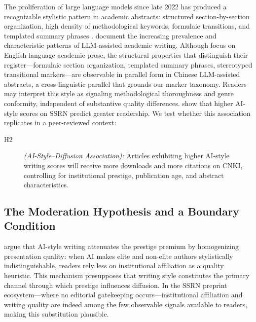 \documentclass[12pt,a4paper]{article}
\begin{document}
The proliferation of large language models since late 2022 has produced
a recognizable stylistic pattern in academic abstracts: structured
section-by-section organization, high density of methodological keywords,
formulaic transitions, and templated summary phrases
\citep{Liang2024,Biber2016}.
\citet{Liang2024} document the increasing prevalence and characteristic
patterns of LLM-assisted academic writing.
Although \citet{Biber2016} focus on English-language academic prose,
the structural properties that distinguish their register---formulaic
section organization, templated summary phrases, stereotyped transitional
markers---are observable in parallel form in Chinese LLM-assisted
abstracts, a cross-linguistic parallel that grounds our marker taxonomy.
Readers may interpret this style as signaling methodological
thoroughness and genre conformity, independent of substantive quality
differences.
\citet{JoLi2026} show that higher AI-style scores on SSRN predict
greater readership.
We test whether this association replicates in a peer-reviewed context:
\begin{description}
  \item[H2] \textit{(AI-Style--Diffusion Association):}
  Articles exhibiting higher AI-style writing scores will receive
  more downloads and more citations on CNKI, controlling for
  institutional prestige, publication age, and abstract
  characteristics.
\end{description}

\subsection{The Moderation Hypothesis and a Boundary Condition}

\citet{JoLi2026} argue that AI-style writing attenuates the prestige
premium by homogenizing presentation quality: when AI makes elite and
non-elite authors stylistically indistinguishable, readers rely less
on institutional affiliation as a quality heuristic.
This mechanism presupposes that writing style constitutes the primary
channel through which prestige influences diffusion.
In the SSRN preprint ecosystem---where no editorial gatekeeping
occurs---institutional affiliation and writing quality are indeed
among the few observable signals available to readers, making this
substitution plausible.
\end{document}
